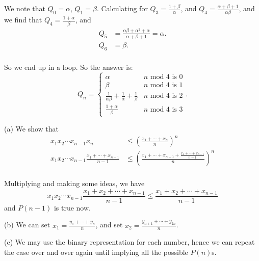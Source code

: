 We note that $Q_0 = \alpha$, $Q_1 = \beta$. Calculating for
$Q_3=\frac{1+\beta}{\alpha}$, and $Q_4=\frac{\alpha+\beta+1}{\alpha\beta}$, and
we find that $Q_4=\frac{1+\alpha}{\beta}$, and 
\begin{align*}
    Q_5&=\frac{\alpha\beta+\alpha^2+\alpha}{\alpha+\beta+1}=\alpha. \\
    Q_6 &= \beta. \\
\end{align*}

So we end up in a loop. So the answer is: 
\[
    Q_n = \begin{cases}
        \alpha & n \text{ mod 4 is 0}\\
        \beta & n \text{ mod 4 is 1}\\
        \frac{1}{\alpha\beta}+\frac{1}{\alpha}+\frac{1}{\beta} & n\text{ mod 4 is
        2}\\
            \frac{1+\alpha}{\beta}& n \text{ mod 4 is 3}
    \end{cases}.
\]

 (a) We show that 
\begin{align*}
    x_1x_2\cdots x_{n-1} x_n &\leq \left( \frac{x_1+\cdots +x_n}{n}  \right)^n
    \\
    x_1x_2\cdots x_{n-1} \frac{x_1+\cdots+x_{n-1}}{n-1} &\leq \left(\frac{
x_1+\cdots+x_{n-1}+\frac{x_1+\cdots +x_{n-1}}{n-1}}{n} \right) ^n \\ 
\end{align*}

Multiplying and making some ideas, we have 
\[
    x_1x_2\cdots x_{n-1}\frac{x_1+x_2+\cdots+x_{n-1}}{n-1} \leq  \frac{x_1+x_2+\cdots +x_{n-1}}{n-1}
\]
and $P(n-1)$ is true now.

(b) We can set $x_1=\frac{y_1+\cdots+y_n}{n}$, and set $x_2=\frac{y_{n+1}+\cdots + y_{2n}}{n}$. 

(c) We may use the binary representation for each number, hence we can repeat the
case over and over again until implying all the possible $P(n)$s. 


